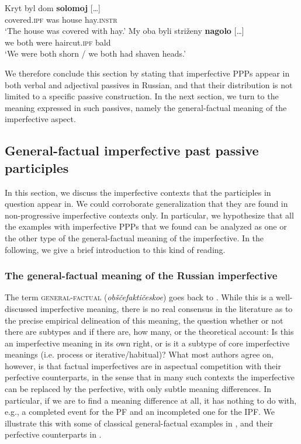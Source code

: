 \documentclass[output=paper,
modfonts,
newtxmath,
hidelinks
]{langscibook}
\begin{document}
\ea\label{kryt}
\ea\gll 	Kryt byl dom \textbf{solomoj} [\dots]\\ 		
	covered.\textsc{ipf} was house hay.\textsc{instr} 	\\
\glt	`The house was covered with hay.'\label{kryta}
\ex\gll	My oba byli striženy \textbf{nagolo} [\dots]\\
	we both were haircut.\textsc{ipf} bald\\
\glt	`We were both shorn / we both had shaven heads.'\label{nagolo} 
\z\z

\noindent We therefore conclude this section by stating that imperfective PPPs appear in both verbal and adjectival passives in Russian, and that their distribution is not limited to a specific passive construction. In the next section, we turn to the meaning expressed in such passives, namely the general-factual meaning of the imperfective aspect.

\subsection{General-factual imperfective past passive participles} 
\label{whichIPF}

In this section, we discuss the imperfective contexts that the participles in question appear in. We could corroborate  generalization that they are found in non-progressive imperfective contexts only. In particular, we hypothesize that all the examples with imperfective PPPs that we found can be analyzed as one or the other type of the general-factual meaning of the imperfective. In the following, we give a brief introduction to this kind of reading.

\subsubsection{The general-factual meaning of the Russian imperfective}
\label{OF}

The term \textsc{general-factual} (\textit{obščefaktičeskoe}) goes back to \citet{maslov59} \citep[for recent discussion see][]{mehlig16}. While this is a well-discussed imperfective meaning, there is no real consensus in the literature \citep[see][chapter 4 for an overview and references]{gronndiss} as to the precise empirical delineation of this meaning, the question whether or not there are subtypes and if there are, how many, or the theoretical account: Is this an imperfective meaning in its own right, or is it a subtype of core imperfective meanings (i.e. process or iterative/habitual)? What most authors agree on, however, is that factual imperfectives are in aspectual competition with their perfective counterparts, in the sense that in many such contexts the imperfective can be replaced by the perfective, with only subtle meaning differences. In particular, if we are to find a meaning difference at all, it has nothing to do with, e.g., a completed event for the PF and an incompleted one for the IPF. We illustrate this with some of  classical general-factual examples in , and their perfective counterparts in . 
\end{document}
